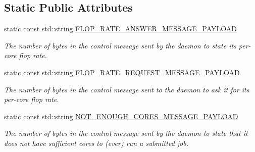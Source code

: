 \subsection*{Static Public Attributes}
\begin{DoxyCompactItemize}
\item 
\mbox{\label{classwrench_1_1_bare_metal_compute_service_message_payload_a10eabc33f0fc2110737b3cf151623250}} 
static const std\+::string \hyperlink{classwrench_1_1_bare_metal_compute_service_message_payload_a10eabc33f0fc2110737b3cf151623250}{F\+L\+O\+P\+\_\+\+R\+A\+T\+E\+\_\+\+A\+N\+S\+W\+E\+R\+\_\+\+M\+E\+S\+S\+A\+G\+E\+\_\+\+P\+A\+Y\+L\+O\+AD}
\begin{DoxyCompactList}\small\item\em The number of bytes in the control message sent by the daemon to state its per-\/core flop rate. \end{DoxyCompactList}\item 
\mbox{\label{classwrench_1_1_bare_metal_compute_service_message_payload_a1ab951377c6247c9b58c0f4494cf2950}} 
static const std\+::string \hyperlink{classwrench_1_1_bare_metal_compute_service_message_payload_a1ab951377c6247c9b58c0f4494cf2950}{F\+L\+O\+P\+\_\+\+R\+A\+T\+E\+\_\+\+R\+E\+Q\+U\+E\+S\+T\+\_\+\+M\+E\+S\+S\+A\+G\+E\+\_\+\+P\+A\+Y\+L\+O\+AD}
\begin{DoxyCompactList}\small\item\em The number of bytes in the control message sent to the daemon to ask it for its per-\/core flop rate. \end{DoxyCompactList}\item 
\mbox{\label{classwrench_1_1_bare_metal_compute_service_message_payload_ae7c1a15d40447d30f00bee194929fd70}} 
static const std\+::string \hyperlink{classwrench_1_1_bare_metal_compute_service_message_payload_ae7c1a15d40447d30f00bee194929fd70}{N\+O\+T\+\_\+\+E\+N\+O\+U\+G\+H\+\_\+\+C\+O\+R\+E\+S\+\_\+\+M\+E\+S\+S\+A\+G\+E\+\_\+\+P\+A\+Y\+L\+O\+AD}
\begin{DoxyCompactList}\small\item\em The number of bytes in the control message sent by the daemon to state that it does not have sufficient cores to (ever) run a submitted job. \end{DoxyCompactList}\end{DoxyCompactItemize}


